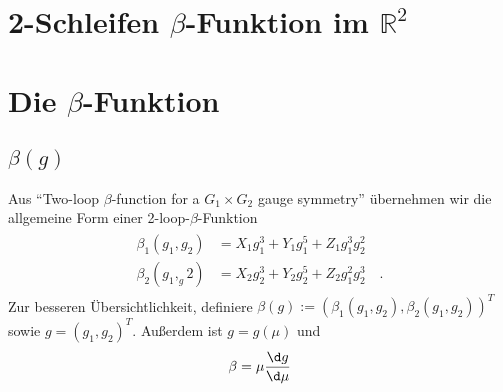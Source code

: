 \section{2-Schleifen $\beta$-Funktion im $\mathbb{R}^2$}

\section{Die $\beta$-Funktion}

  \subsection{$\beta(g)$}
      
	Aus ``Two-loop $\beta$-function for a $G_1\times G_2$ gauge symmetry''\cite{PhysRevD.25.581} übernehmen 
	wir die allgemeine Form einer 2-loop-$\beta$-Funktion
	\begin{align}
	      \begin{aligned}
	      \beta_1(g_1,g_2)&=X_1 g_1^3+ Y_1 g_1^5+ Z_1g_1^3g_2^2\\
	      \beta_2(g_1,_g2)&=X_2 g_2^3+Y_2 g_2^5+ Z_2 g_1^2 g_2^3 \quad. 
	      \end{aligned} \label{beta(g)}
	\end{align}
	Zur besseren Übersichtlichkeit, definiere $\beta(g):=(\beta_1(g_1,g_2),\beta_2(g_1,g_2))^T$ sowie $g=(g_1,g_2)^T$.
	Außerdem ist $g=g(\mu)$ und
	\begin{equation}
	\beta=\mu \frac{\d g}{\d \mu}
	\end{equation}